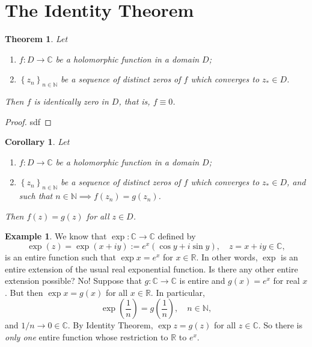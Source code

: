 \documentclass[12pt,openany]{book}
\newtheorem{theorem}{Theorem}[chapter]
\newtheorem{corollary}{Corollary}[theorem]
\theoremstyle{definition}
\newtheorem{example}{Example}[section]
\newcommand{\set}[1]{\left\{#1\right\}}
\newcommand{\N}{\mathbb{N}}
\newcommand{\R}{\mathbb{R}}
\newcommand{\C}{\mathbb{C}}
\newcommand{\of}[1]{\left( #1 \right)}
\begin{document}
	\section{The Identity Theorem}
	
	\begin{tcolorbox}[colback=white,colframe=thmcolor,arc=5pt,title={\color{white}\bf }]
		\begin{theorem}
			Let \begin{enumerate}[(1)]
				\item $f:D\to\C$ be a holomorphic function in a domain $D$;
				\item $\set{z_n}_{n\in\N}$ be a sequence of distinct zeros of $f$ which converges to $z_*\in D$.
			\end{enumerate} Then $f$ is identically zero in $D$, that is, $f\equiv 0$.
		\end{theorem}
	\end{tcolorbox}
	\begin{proof}
		sdf
	\end{proof}
	\vspace{4pt}
	\begin{tcolorbox}[colback=white,colframe=corcolor,arc=5pt,title={\color{white}\bf Identity Theorem}]
		\begin{corollary}
			Let \begin{enumerate}[(1)]
				\item $f:D\to\C$ be a holomorphic function in a domain $D$;
				\item $\set{z_n}_{n\in\N}$ be a sequence of distinct zeros of $f$ which converges to $z_*\in D$, and such that $n\in\N\implies f(z_n)=g(z_n)$.
			\end{enumerate} Then $f(z)=g(z)$ for all $z\in D$.
		\end{corollary}
	\end{tcolorbox}
	\vspace{8pt}
	\begin{example}
		We know that $\exp:\C\to\C$ defined by \[
		\exp (z)=\exp(x+iy):=e^x\of{\cos y+i\sin y},\quad z=x+iy\in\C,
		\] is an entire function such that $\exp x=e^x$ for $x\in\R$. In other words, $\exp$ is an entire extension of the usual real exponential function. Is there any other entire extension possible? No! Suppose that $g:\C\to\C$ is entire and $g(x)=e^x$ for real $x$. But then $\exp x=g(x)$ for all $x\in\R$. In particular, \[
		\exp\of{\frac{1}{n}}=g\of{\frac{1}{n}},\quad n\in\N,
		\] and $1/n\to 0\in\C$. By Identity Theorem, $\exp z=g(z)$ for all $z\in\C$. So there is \textit{only one} entire function whose restriction to $\R$ to $e^x$.
	\end{example}
	
\end{document}
